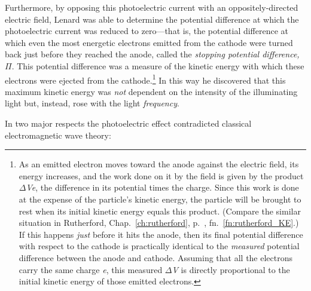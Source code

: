 Furthermore, by opposing this photoelectric current with an
oppositely-directed electric field, Lenard was able to determine the
potential difference at which the photoelectric current was reduced to
zero---that is, the potential difference at which even the most
energetic electrons emitted from the cathode were turned back just
before they reached the anode, called the \emph{stopping potential
difference,} $\Pi$. This potential difference was a measure of the
kinetic energy with which these electrons were ejected from the
cathode.\footnote{As an emitted electron moves toward the anode against
  the electric field, its energy increases, and the work done on it by
  the field is given by the product $\Delta$\emph{Ve}, the difference in its
  potential times the charge. Since this work is done at the expense of
  the particle's kinetic energy, the particle will be brought to rest
  when its initial kinetic energy equals this product. (Compare the
  similar situation in Rutherford, Chap.~\ref{ch:rutherford}, p.~\pageref{fn:rutherford_KE}, fn.~\ref{fn:rutherford_KE}.) If this happens
  \emph{just} before it hits the anode, then its final potential
  difference with respect to the cathode is practically identical to the
  \emph{measured} potential difference between the anode and cathode.
  Assuming that all the electrons carry the same charge \emph{e}, this
  measured $\Delta$\emph{V} is directly proportional to the initial kinetic
  energy of those emitted electrons.} In this way he discovered that
this maximum kinetic energy was \emph{not} dependent on the intensity of
the illuminating light but, instead, rose with the light
\emph{frequency}.

In two major respects the photoelectric effect contradicted classical
electromagnetic wave theory:

